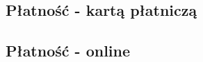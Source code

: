 \documentclass{sprawozdanie-agh}
\begin{document}
\begin{landscape}
\newpage
\subsection{Płatność - kartą płatniczą}
\begin{figure}
    
\end{figure}

\newpage
\subsection{Płatność - online}
\begin{figure}
    
\end{figure}
\end{landscape}
\end{document}

